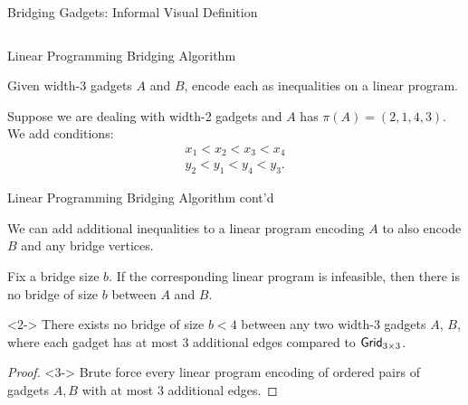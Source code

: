 \begin{frame}{Bridging Gadgets: Informal Visual Definition}
\begin{columns}[T,totalwidth=\linewidth]
\vspace{0.5cm}


\vspace{0.5cm}


\end{columns}

\end{frame}

\begin{frame}{Linear Programming Bridging Algorithm}

\begin{definition}[Informal]
Given width-3 gadgets $A$ and $B$, encode each as inequalities on a linear program.
\end{definition}

\begin{example}
Suppose we are dealing with width-2 gadgets and $A$ has $\pi(A) = (2,1,4,3)$. We add conditions:
\begin{align}
    x_1 < x_2 < x_3 < x_4 \\
    y_2 < y_1 < y_4 < y_3.
\end{align}
\end{example}
\end{frame}

\begin{frame}{Linear Programming Bridging Algorithm cont'd}

\begin{lemma}[Informal]
We can add additional inequalities to a linear program encoding $A$ to also encode $B$ and any bridge vertices.
\end{lemma}

\begin{theorem}
Fix a bridge size $b$. If the corresponding linear program is infeasible, then there is no bridge of size $b$ between $A$ and $B$.
\end{theorem}

\begin{fact}<2->
There exists no bridge of size $b < 4$ between any two width-3 gadgets $A$, $B$, where each gadget has at most 3 additional edges compared to $\textsf{Grid}_{3 \times 3}$.
\end{fact}

\begin{proof}<3->
Brute force every linear program encoding of ordered pairs of gadgets $A,B$ with at most 3 additional edges.
\end{proof}

\end{frame}
